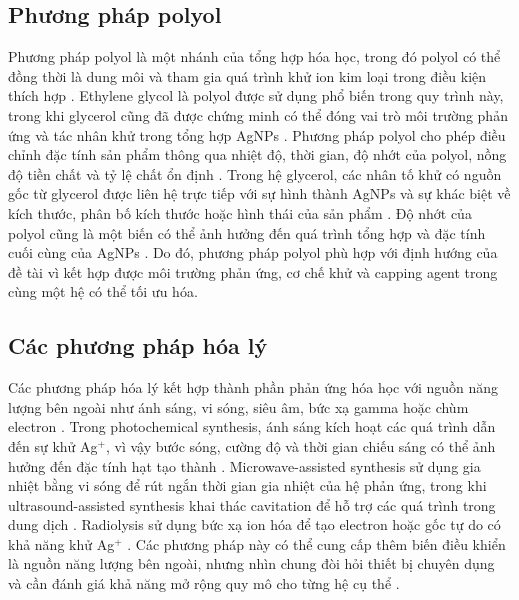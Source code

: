 \subsection{Phương pháp polyol}
Phương pháp polyol là một nhánh của tổng hợp hóa học, trong đó polyol có thể đồng thời là dung môi và tham gia quá trình khử ion kim loại trong điều kiện thích hợp \parencite{wolf2022,liu2020glycerol}.
Ethylene glycol là polyol được sử dụng phổ biến trong quy trình này, trong khi glycerol cũng đã được chứng minh có thể đóng vai trò môi trường phản ứng và tác nhân khử trong tổng hợp AgNPs \parencite{wolf2022,liu2020glycerol}.
Phương pháp polyol cho phép điều chỉnh đặc tính sản phẩm thông qua nhiệt độ, thời gian, độ nhớt của polyol, nồng độ tiền chất và tỷ lệ chất ổn định \parencite{wolf2022}.
Trong hệ glycerol, các nhân tố khử có nguồn gốc từ glycerol được liên hệ trực tiếp với sự hình thành AgNPs và sự khác biệt về kích thước, phân bố kích thước hoặc hình thái của sản phẩm \parencite{liu2020glycerol}.
Độ nhớt của polyol cũng là một biến có thể ảnh hưởng đến quá trình tổng hợp và đặc tính cuối cùng của AgNPs \parencite{wolf2022}.
Do đó, phương pháp polyol phù hợp với định hướng của đề tài vì kết hợp được môi trường phản ứng, cơ chế khử và capping agent trong cùng một hệ có thể tối ưu hóa.
\par
\subsection{Các phương pháp hóa lý}
Các phương pháp hóa lý kết hợp thành phần phản ứng hóa học với nguồn năng lượng bên ngoài như ánh sáng, vi sóng, siêu âm, bức xạ gamma hoặc chùm electron \parencite{iravani2014,nguyen2023}.
Trong photochemical synthesis, ánh sáng kích hoạt các quá trình dẫn đến sự khử Ag$^+$, vì vậy bước sóng, cường độ và thời gian chiếu sáng có thể ảnh hưởng đến đặc tính hạt tạo thành \parencite{iravani2014,lee2019}.
Microwave-assisted synthesis sử dụng gia nhiệt bằng vi sóng để rút ngắn thời gian gia nhiệt của hệ phản ứng, trong khi ultrasound-assisted synthesis khai thác cavitation để hỗ trợ các quá trình trong dung dịch \parencite{iravani2014,nguyen2023}.
Radiolysis sử dụng bức xạ ion hóa để tạo electron hoặc gốc tự do có khả năng khử Ag$^+$ \parencite{iravani2014}.
Các phương pháp này có thể cung cấp thêm biến điều khiển là nguồn năng lượng bên ngoài, nhưng nhìn chung đòi hỏi thiết bị chuyên dụng và cần đánh giá khả năng mở rộng quy mô cho từng hệ cụ thể \parencite{nguyen2023}.
\par
